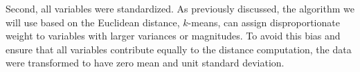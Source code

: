 \documentclass[a4paper,11pt,oneside]{article}
\begin{document}
Second, all variables were standardized. As previously discussed, the algorithm we will use based on the Euclidean distance, \(k\)-means, can assign disproportionate weight to variables with larger variances or magnitudes. To avoid this bias and ensure that all variables contribute equally to the distance computation, the data were transformed to have zero mean and unit standard deviation.

\end{document}
